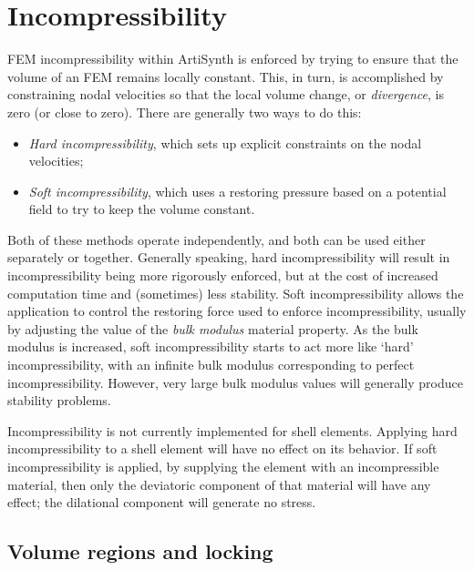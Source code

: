 \section{Incompressibility}

FEM incompressibility within ArtiSynth is enforced by trying to ensure
that the volume of an FEM remains locally constant. This, in turn, is
accomplished by constraining nodal velocities so that the local volume change,
or \emph{divergence}, is zero (or close to zero). There are generally two
ways to do this:

\begin{itemize}
\item {\it Hard incompressibility}, which sets up explicit constraints on the
nodal velocities;
\item {\it Soft incompressibility}, which uses a restoring pressure based on a
potential field to try to keep the volume constant.
\end{itemize}

Both of these methods operate independently, and both can be used
either separately or together. Generally speaking, hard incompressibility
will result in incompressibility being more rigorously enforced, but
at the cost of increased computation time and (sometimes) less
stability. Soft incompressibility allows the application to control
the restoring force used to enforce incompressibility, usually by
adjusting the value of the \emph{bulk modulus} material property.  As
the bulk modulus is increased, soft incompressibility starts to act
more like `hard' incompressibility, with an infinite bulk modulus
corresponding to perfect incompressibility. However, very large bulk
modulus values will generally produce stability problems.

\begin{sideblock}
Incompressibility is not currently implemented for shell
elements. Applying hard incompressibility to a shell element will have
no effect on its behavior. If soft incompressibility is applied,
by supplying the  element with an incompressible material, then only
the deviatoric component of that material will have any effect; the
dilational component will generate no stress.
\end{sideblock}

\subsection{Volume regions and locking}
\label{VolumeRegions:sec}

